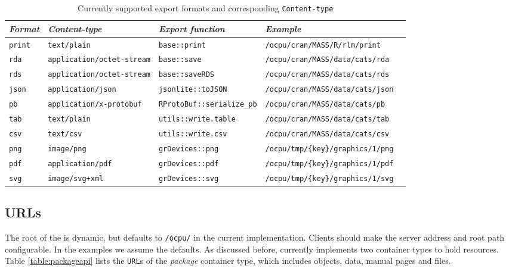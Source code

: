 \begin{sidewaystable}[ht]
\mytablesize
\centering
\begin{tabular}{@{}lllll@{}}
\toprule
 \emph{Format} & \emph{Content-type}             & \emph{Export function}      & \emph{Example}    \\ \midrule
 \texttt{print}  & \texttt{text/plain}               & \texttt{base::print}    & \texttt{/ocpu/cran/MASS/R/rlm/print}          \\
 \texttt{rda}    & \texttt{application/octet-stream} & \texttt{base::save}     & \texttt{/ocpu/cran/MASS/data/cats/rda}          \\
 \texttt{rds}    & \texttt{application/octet-stream} & \texttt{base::saveRDS}  & \texttt{/ocpu/cran/MASS/data/cats/rds}          \\
 \texttt{json}   & \texttt{application/json}         & \texttt{jsonlite::toJSON}   & \texttt{/ocpu/cran/MASS/data/cats/json}      \\
 \texttt{pb}     & \texttt{application/x-protobuf}   & \texttt{RProtoBuf::serialize\_pb} & \texttt{/ocpu/cran/MASS/data/cats/pb} \\
 \texttt{tab}    & \texttt{text/plain}               & \texttt{utils::write.table}   & \texttt{/ocpu/cran/MASS/data/cats/tab}    \\
 \texttt{csv}    & \texttt{text/csv}                 & \texttt{utils::write.csv}    & \texttt{/ocpu/cran/MASS/data/cats/csv}     \\
 \texttt{png}    & \texttt{image/png}                & \texttt{grDevices::png}      & \texttt{/ocpu/tmp/\{key\}/graphics/1/png}    \\
 \texttt{pdf}    & \texttt{application/pdf}          & \texttt{grDevices::pdf}      & \texttt{/ocpu/tmp/\{key\}/graphics/1/pdf}     \\
 \texttt{svg}    & \texttt{image/svg+xml}            & \texttt{grDevices::svg}      & \texttt{/ocpu/tmp/\{key\}/graphics/1/svg}     \\ \bottomrule
\end{tabular}
\caption{Currently supported export formats and corresponding \texttt{Content-type}}
\label{table:formats}
\end{sidewaystable}

\subsection{URLs}

The root of the \API is dynamic, but defaults to \texttt{/ocpu/} in the current implementation. Clients should make the \OpenCPU server address and root path configurable. In the examples we assume the defaults. As discussed before, \OpenCPU currently implements two container types to hold resources. Table \ref{table:packageapi} lists the \texttt{URL}s of the \emph{package} container type, which includes objects, data, manual pages and files.

